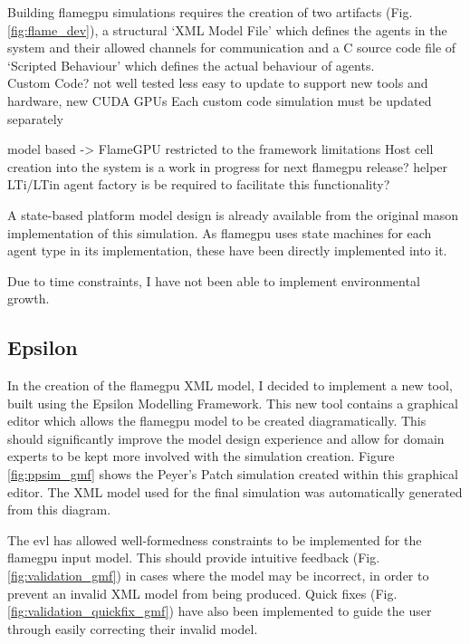 \documentclass{UoYCSproject}
\begin{document}
Building \acrshort{flamegpu} simulations requires the creation of two artifacts (Fig. \ref{fig:flame_dev}), a structural `XML Model File' which defines the agents in the system and their allowed channels for communication and a C source code file of `Scripted Behaviour' which defines the actual behaviour of agents.
\\

Custom Code?\cite{phil_diss}
	not well tested
	less easy to update to support new tools and hardware, new CUDA GPUs
		Each custom code simulation must be updated separately


model based -> FlameGPU\cite{flame_keratinocyte}
	restricted to the framework limitations
		Host cell creation into the system is a work in progress for next \acrshort{flamegpu} release?
			helper LTi/LTin agent factory is be required to facilitate this functionality?


A state-based platform model design is already available from the original \acrshort{mason} implementation of this simulation.
As \acrshort{flamegpu} uses state machines for each agent type in its implementation, these have been directly implemented into it.

Due to time constraints, I have not been able to implement environmental growth.

\subsection{Epsilon}
In the creation of the \acrshort{flamegpu} XML model, I decided to implement a new tool, built using the Epsilon Modelling Framework.
This new tool contains a graphical editor which allows the \acrshort{flamegpu} model to be created diagramatically.
This should significantly improve the model design experience and allow for domain experts to be kept more involved with the simulation creation.
Figure \ref{fig:ppsim_gmf} shows the Peyer's Patch simulation created within this graphical editor. The XML model used for the final simulation was automatically generated from this diagram.

The \acrlong{evl} has allowed well-formedness constraints to be implemented for the \acrshort{flamegpu} input model.
This should provide intuitive feedback (Fig. \ref{fig:validation_gmf}) in cases where the model may be incorrect, in order to prevent an invalid XML model from being produced.
Quick fixes (Fig. \ref{fig:validation_quickfix_gmf}) have also been implemented to guide the user through easily correcting their invalid model.
\end{document}
